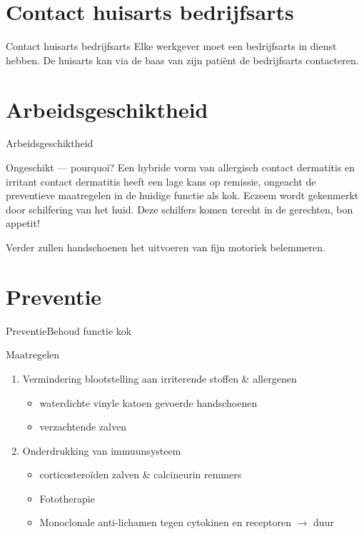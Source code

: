 \documentclass[aspectratio=169]{beamer}
\begin{document}
\section{Contact huisarts bedrijfsarts}
\begin{frame}{Contact huisarts bedrijfsarts}
Elke werkgever moet een bedrijfsarts in dienst hebben. De huisarts kan via de baas van zijn patiënt de bedrijfsarts contacteren.
\end{frame}
\section{Arbeidsgeschiktheid}
\begin{frame}{Arbeidsgeschiktheid}
    \begin{block}{Ongeschikt --- pourquoi?}
        Een hybride vorm van allergisch contact dermatitis en irritant contact dermatitis heeft een lage kans op remissie, ongeacht de preventieve maatregelen in de huidige functie als kok. Eczeem wordt gekenmerkt door schilfering van het huid. Deze schilfers komen terecht in de gerechten, bon appetit!

        Verder zullen handschoenen het uitvoeren van fijn motoriek belemmeren.
    \end{block}
\end{frame}

\section{Preventie}
\begin{frame}{Preventie}{Behoud functie kok}
    \begin{block}{Maatregelen}
        \begin{enumerate}
            \item Vermindering blootstelling aan irriterende stoffen \& allergenen
                \begin{itemize}
                    \item waterdichte vinyle katoen gevoerde handschoenen
                    \item verzachtende zalven
                \end{itemize}
            \item Onderdrukking van immuunsysteem
                \begin{itemize}
                    \item corticosteroïden zalven \& calcineurin remmers
                    \item Fototherapie
                    \item Monoclonale anti-lichamen tegen cytokinen en receptoren $\rightarrow$ duur
                \end{itemize}
        \end{enumerate}
    \end{block}
\end{frame}
\end{document}
